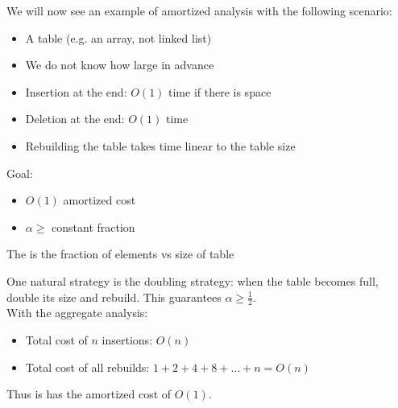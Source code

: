 \documentclass[../main/main.tex]{subfiles}
\begin{document}
We will now see an example of amortized analysis with the following scenario:
\begin{itemize}
	\item A table (e.g. an array, not linked list)
	\item We do not know how large in advance
	\item Insertion at the end: $O(1)$ time if there is space
	\item Deletion at the end: $O(1)$ time
	\item Rebuilding the table takes time linear to the table size
\end{itemize}
Goal: 
\begin{itemize}
	\item $O(1)$ amortized cost
	\item {}  $\alpha\ge $ constant fraction
\end{itemize}
\begin{definition}
	The  is the fraction of elements vs size of table
\end{definition}
One natural strategy is the doubling strategy: when the table becomes full, double its size and rebuild. This guarantees $\alpha\ge \frac{1}{2}$.\\

With the aggregate analysis: 
\begin{itemize}
	\item Total cost of $n$ insertions: $O(n)$
	\item Total cost of all rebuilds:  $1+2+4+8+\ldots+n=O(n)$
\end{itemize}
Thus is has the amortized cost of $O(1)$.\\
\end{document}

